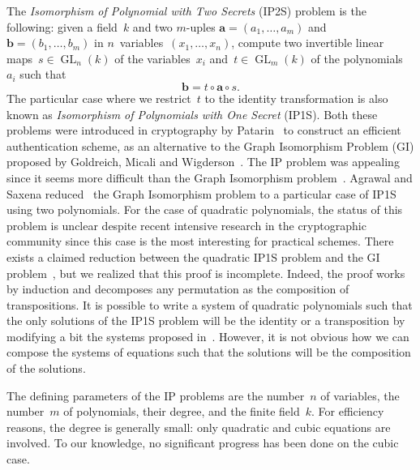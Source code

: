 \documentclass{amsart}
\DeclareMathOperator\GL{GL}
\begin{document}
The \emph{Isomorphism of Polynomial with Two Secrets} (IP2S) problem is
the following: given a field~$k$ and two $m$-uples $\bm{a} = (a_1, …,
a_m)$ and~$\bm{b} = (b_1, …, b_m)$ in $n$~variables~$(x_1, …, x_n)$, compute
two invertible linear maps~$s ∈ \GL_n(k)$ of the variables~$x_i$
and~$t ∈ \GL_m(k)$ of the polynomials~$a_i$ such that
\begin{equation*}
\bm{b} = t ∘ \bm{a} ∘ s.
\end{equation*}
The particular case where we restrict~$t$ to the identity transformation
is also known as \emph{Isomorphism of Polynomials with One Secret}
(IP1S).
Both these problems were introduced in cryptography by
Patarin~\cite{DBLP:conf/eurocrypt/Patarin96} to construct an efficient
authentication scheme, 
as an alternative to the Graph Isomorphism Problem (GI) proposed by Goldreich, Micali and Wigderson~\cite{DBLP:journals/jacm/GoldreichMW91}.
The IP problem was appealing since 
it seems more difficult than the Graph Isomorphism problem~\cite{DBLP:conf/eurocrypt/PatarinGC98}. 
Agrawal and Saxena reduced~\cite{DBLP:conf/stacs/AgrawalS06} the Graph
Isomorphism problem to a particular case of IP1S using two polynomials.
For the case of quadratic polynomials, the status of this problem is unclear despite recent 
intensive research in the cryptographic community since this case is the most interesting 
for practical schemes. There exists a claimed reduction between the quadratic IP1S problem and the GI
problem~\cite{DBLP:conf/eurocrypt/PatarinGC98}, but we realized that this proof is incomplete. 
Indeed, the proof works by induction and decomposes any permutation as the composition of 
transpositions. It is possible to write a system of quadratic polynomials such that the only solutions 
of the IP1S problem will be the identity or a transposition by modifying a bit the systems proposed 
in~\cite{DBLP:conf/eurocrypt/PatarinGC98}. However, it is not obvious how we can compose the systems 
of equations such that the solutions will be the composition of the solutions. 

\bigbreak

The defining parameters of the IP problems are the number~$n$ of
variables, the number~$m$ of polynomials, their degree, and the finite
field~$k$.
For efficiency reasons, the degree is generally small:
only quadratic and cubic equations are involved.
To our knowledge, no significant progress has been done on the cubic case.
\end{document}
